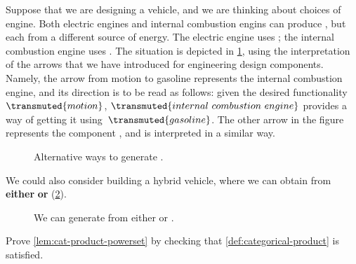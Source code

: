
\begin{example}
	Suppose that we are designing a vehicle, and we are thinking about choices of engine.
	Both electric engines and internal combustion engins can produce , but each from a different source of energy.
	The electric engine uses ; the internal combustion engine uses .
	The situation is depicted in \cref{fig:e14}, using the interpretation of the arrows that we have introduced for engineering design components.
	Namely, the arrow from motion to gasoline represents the internal combustion engine, and its direction is to be read as follows: given the desired functionality~$\transmuted{motion}$, $\transmuted{internal \ combustion \ engine}$ provides a way of getting it using~$\transmuted{gasoline}$.
	The other arrow in the figure represents the component , and is interpreted in a similar way.

	\begin{figure}[h!]
		\centering
		\caption{Alternative ways to generate . }
		\label{fig:e14}
	\end{figure}

	We could also consider building a hybrid vehicle, where we can obtain  from \textbf{either}  \textbf{or}  (\cref{fig:e15}).

	\begin{figure}[h!]
		\centering
		\caption{We can generate  from either  or  .}
		\label{fig:e15}
	\end{figure}
\end{example}

\vfill
\begin{gradedexercise}
	\label{ex:CatProductPowerset}
	Prove \cref{lem:cat-product-powerset} by checking that \cref{def:categorical-product} is satisfied.
\end{gradedexercise}

